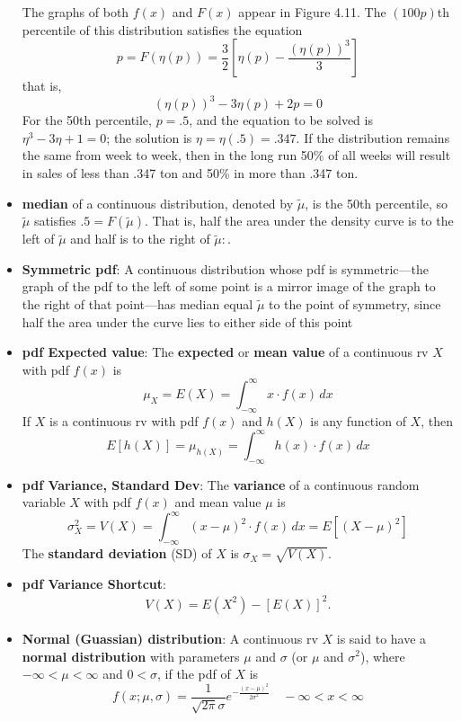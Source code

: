 \documentclass{report}
\begin{document}
\begin{itemize}
\[        \]
        The graphs of both $f(x)$ and $F(x)$ appear in Figure 4.11. The $(100p)$th percentile of this distribution satisfies the equation
        \[
            p = F(\eta(p)) = \frac{3}{2} \left[ \eta(p) - \frac{(\eta(p))^3}{3} \right]
        \]
        that is,
        \[
            (\eta(p))^3 - 3\eta(p) + 2p = 0
        \]
        For the 50th percentile, $p = .5$, and the equation to be solved is $\eta^3 - 3\eta + 1 = 0$; the solution is $\eta = \eta(.5) = .347$. If the distribution remains the same from week to week, then in the long run 50\% of all weeks will result in sales of less than .347 ton and 50\% in more than .347 ton.
    \item \textbf{median} of a continuous distribution, denoted by $\tilde{\mu}$, is the 50th percentile, so $\tilde{\mu}$ satisfies $.5 = F(\tilde{\mu})$. That is, half the area under the density curve is to the left of $\tilde{\mu}$ and half is to the right of $\tilde{\mu}:$.
    \item \textbf{Symmetric pdf}:
        A continuous distribution whose pdf is symmetric—the graph of the pdf to the
        left of some point is a mirror image of the graph to the right of that point—has
        median equal $\tilde{\mu}$ to the point of symmetry, since half the area under the curve lies
        to either side of this point
        \bigbreak \noindent 
    \item \textbf{pdf Expected value}:
        The \textbf{expected} or \textbf{mean value} of a continuous rv $X$ with pdf $f(x)$ is
        \[
            \mu_X = E(X) = \int_{-\infty}^{\infty} x \cdot f(x) \, dx
        \]
        \bigbreak \noindent 
        If $X$ is a continuous rv with pdf $f(x)$ and $h(X)$ is any function of $X$, then
        \[
            E[h(X)] = \mu_{h(X)} = \int_{-\infty}^{\infty} h(x) \cdot f(x) \, dx
        \]
    \item \textbf{pdf Variance, Standard Dev}:
        The \textbf{variance} of a continuous random variable $X$ with pdf $f(x)$ and mean value $\mu$ is
        \[
            \sigma_X^2 = V(X) = \int_{-\infty}^{\infty} (x - \mu)^2 \cdot f(x) \, dx = E[(X - \mu)^2]
        \]
        The \textbf{standard deviation} (SD) of $X$ is $\sigma_X = \sqrt{V(X)}$.
    \item \textbf{pdf Variance Shortcut}:
        \begin{align*}
            V(X) = E(X^{2}) - \left[E(X)\right]^{2}
        .\end{align*}
    \item \textbf{Normal (Guassian) distribution}:
        A continuous rv $X$ is said to have a \textbf{normal distribution} with parameters $\mu$ and $\sigma$ (or $\mu$ and $\sigma^2$), where $-\infty < \mu < \infty$ and $0 < \sigma$, if the pdf of $X$ is
        \[
            f(x; \mu, \sigma) = \frac{1}{\sqrt{2\pi}\sigma} e^{-\frac{(x - \mu)^2}{2\sigma^2}} \quad -\infty < x < \infty
        \]


\end{itemize}
\end{document}
